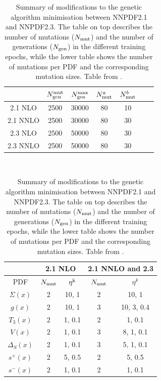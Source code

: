 \begin{table}
\begin{center}
  \begin{tabular}{|c||c|c|c|c|c|c|}
    \hline 
 &  $N_{\rm gen}^{\rm mut}$
&   $N_{\rm gen}^{\rm max}$ & $N_{\rm mut}^a$ 
&  $N_{\rm mut}^b $\\
    \hline
2.1 NLO &   2500 & 30000 &  80 & 10\\
    \hline
2.1 NNLO &    2500 & 30000  & 80 & 30\\
    \hline
    \hline
2.3 NLO &    2500 & 50000 & 80 & 30\\
    \hline
2.3 NNLO &   2500 & 50000 & 80 & 30\\
    \hline
  \end{tabular}\\

\bigskip

  \begin{tabular}{|c||c|c|c|c|}
\hline
&  \multicolumn{2}{|c|}{2.1 NLO} &
   \multicolumn{2}{|c|}{2.1 NNLO and 2.3}    \\
    \hline 
PDF &   $N_{\rm mut}$ &  $\eta^{\rm k}$ &  $N_{\rm mut}$ &  $\eta^{k}$  \\
    \hline
\hline 
$\Sigma(x)$   &2 & 10, 1 & 2 & 10, 1 \\
$g(x)$  & 2& 10, 1& 3 & 10, 3, 0.4 \\
$T_3(x)$  &2 & 1, 0.1 & 2 &  1, 0.1 \\
$V(x)$  &2 & 1, 0.1 & 3 &  8, 1, 0.1\\
$\Delta_S(x)$  &2 & 1, 0.1 &3 & 5, 1, 0.1 \\
$s^+(x)$  & 2&  5, 0.5 & 2 & 5, 0.5 \\
$s^-(x)$  & 2&  1, 0.1& 2 & 1, 0.1\\
\hline 
  \end{tabular}
  \end{center}
  \caption[Summary of modifications to the genetic algorithm minimisation between NNPDF2.1 and NNPDF2.3]{Summary of modifications to the genetic algorithm minimisation between NNPDF2.1 and NNPDF2.3. The table on top describes the number of mutations  ($N_{\rm mut}$) and the number of generations ($N_{\rm gen}$) in the different training epochs, while the lower table shows the number of mutations per PDF and the corresponding mutation sizes. Table from \cite{Ball:2012cx}.}
  \label{tab:gapars}
\end{table}


